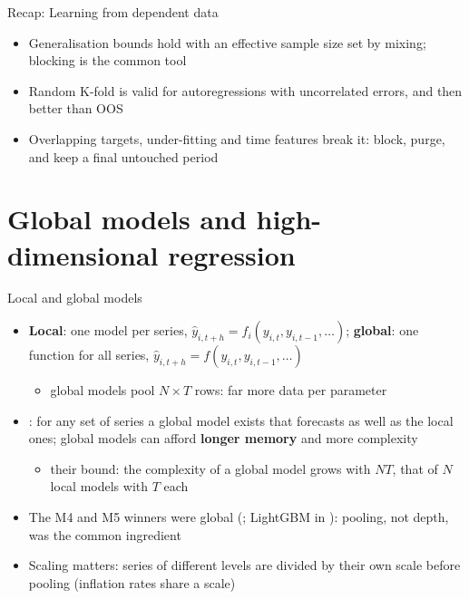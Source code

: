 \begin{frame}{Recap: Learning from dependent data}
\itemsize{\small}
\begin{itemize}
    \item Generalisation bounds hold with an effective sample size set by mixing; blocking is the common tool
    \item Random K-fold is valid for autoregressions with uncorrelated errors, and then better than OOS
    \item Overlapping targets, under-fitting and time features break it: block, purge, and keep a final untouched period
\end{itemize}
\end{frame}


\section{Global models and high-dimensional regression}

\begin{frame}{Local and global models}
\itemsize{\small}
\begin{itemize}
    \item \textbf{Local}: one model per series, $\hat y_{i,t+h} = f_i(y_{i,t}, y_{i,t-1},\dots)$; \textbf{global}: one function for all series, $\hat y_{i,t+h} = f(y_{i,t}, y_{i,t-1},\dots)$
    \begin{itemize}
        \item global models pool $N \times T$ rows: far more data per parameter
    \end{itemize}
    \item {}: for any set of series a global model exists that forecasts as well as the local ones; global models can afford \textbf{longer memory} and more complexity
    \begin{itemize}
        \item their bound: the complexity of a global model grows with $NT$, that of $N$ local models with $T$ each
    \end{itemize}
    \item The M4 and M5 winners were global (; LightGBM in ): pooling, not depth, was the common ingredient
    \item Scaling matters: series of different levels are divided by their own scale before pooling (inflation rates share a scale)
\end{itemize}
\end{frame}

